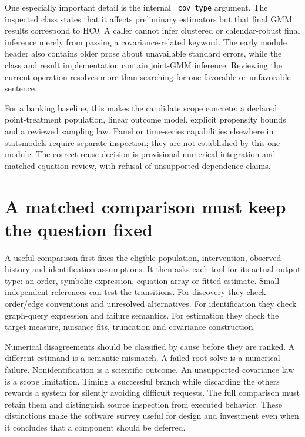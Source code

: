 One especially important detail is the internal \texttt{\_cov\_type} argument.
The inspected class states that it affects preliminary estimators but that final
GMM results correspond to HC0. A caller cannot infer clustered or calendar-robust
final inference merely from passing a covariance-related keyword. The early
module header also contains older prose about unavailable standard errors,
while the class and result implementation contain joint-GMM inference. Reviewing
the current operation resolves more than searching for one favorable or
unfavorable sentence. \citep{v13_sw_statsmodels}

For a banking baseline, this makes the candidate scope concrete: a declared
point-treatment population, linear outcome model, explicit propensity bounds
and a reviewed sampling law. Panel or time-series capabilities elsewhere in
statsmodels require separate inspection; they are not established by this one
module. The correct reuse decision is provisional numerical integration and
matched equation review, with refusal of unsupported dependence claims.

\section{A matched comparison must keep the question fixed}

A useful comparison first fixes the eligible population, intervention, observed
history and identification assumptions. It then asks each tool for its actual
output type: an order, symbolic expression, equation array or fitted estimate.
Small independent references can test the transitions. For discovery they
check order/edge conventions and unresolved alternatives. For identification
they check graph-query expression and failure semantics. For estimation they
check the target measure, nuisance fits, truncation and covariance construction.

Numerical disagreements should be classified by cause before they are ranked.
A different estimand is a semantic mismatch. A failed root solve is a numerical
failure. Nonidentification is a scientific outcome. An unsupported covariance
law is a scope limitation. Timing a successful branch while discarding the
others rewards a system for silently avoiding difficult requests. The full
comparison must retain them and distinguish source inspection from executed
behavior. These distinctions make the software survey useful for design and
investment even when it concludes that a component should be deferred.

